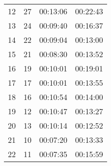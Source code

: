 \documentclass[10pt,twoside,english]{scrartcl}
\begin{document}
\begin{table}[H]
\begin{tabular}{rrrr}
12 & 27 & {\color{light_gray}00:}13:06 & {\color{light_gray}00:}22:43\\
13 & 24 & {\color{light_gray}00:0}9:40 & {\color{light_gray}00:}16:37\\
14 & 22 & {\color{light_gray}00:0}9:04 & {\color{light_gray}00:}13:00\\
15 & 21 & {\color{light_gray}00:0}8:30 & {\color{light_gray}00:}13:52\\
16 & 19 & {\color{light_gray}00:}10:01 & {\color{light_gray}00:}19:01\\
17 & 17 & {\color{light_gray}00:}10:01 & {\color{light_gray}00:}13:55\\
18 & 16 & {\color{light_gray}00:}10:54 & {\color{light_gray}00:}14:00\\
19 & 12 & {\color{light_gray}00:}10:47 & {\color{light_gray}00:}13:27\\
20 & 13 & {\color{light_gray}00:}10:14 & {\color{light_gray}00:}12:52\\
21 & 10 & {\color{light_gray}00:0}7:20 & {\color{light_gray}00:}13:33\\
22 & 11 & {\color{light_gray}00:0}7:35 & {\color{light_gray}00:}15:59\\
\hline 
\end{tabular}


\end{table}
\end{document}
